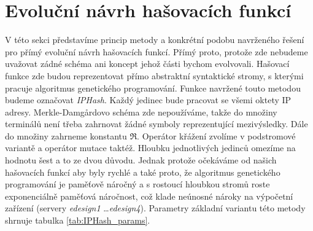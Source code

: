 \section{Evoluční návrh hašovacích funkcí}
V této sekci představíme princip metody a konkrétní podobu navrženého řešení pro přímý evoluční 
návrh hašovacích funkcí. Přímý proto, protože zde nebudeme uvažovat zádné schéma ani koncept
jehož části bychom evolvovali. Hašovací funkce zde budou reprezentovat přímo abstraktní syntaktické
stromy, s kterými pracuje algoritmus genetického programování. Funkce navržené touto metodou 
budeme označovat \textit{IPHash}. Každý jedinec bude pracovat se všemi oktety IP adresy.
Merkle-Damg\r{a}rdovo schéma zde nepoužíváme, takže do množiny terminálů není třeba zahrnovat
žádné symboly reprezentující mezivýsledky. Dále do množiny zahrneme konstantu  $\Re$. Operátor
křážení zvolíme v podstromové variantě a operátor mutace taktéž. Hloubku jednotlivých jedinců omezíme
na hodnotu šest a to ze dvou důvodu. Jednak protože očekáváme od našich hašovacích funkcí aby byly
rychlé a také proto, že algoritmus genetického programování je paměťově náročný a s rostoucí hloubkou
stromů roste exponenciálně paměťová náročnost, což klade neúnosné nároky na výpočetní zařízení 
(servery \textit{edesign1} \ldots \textit{edesign4}). Parametry základní variantu této metody shrnuje 
tabulka \ref{tab:IPHash_params}.

